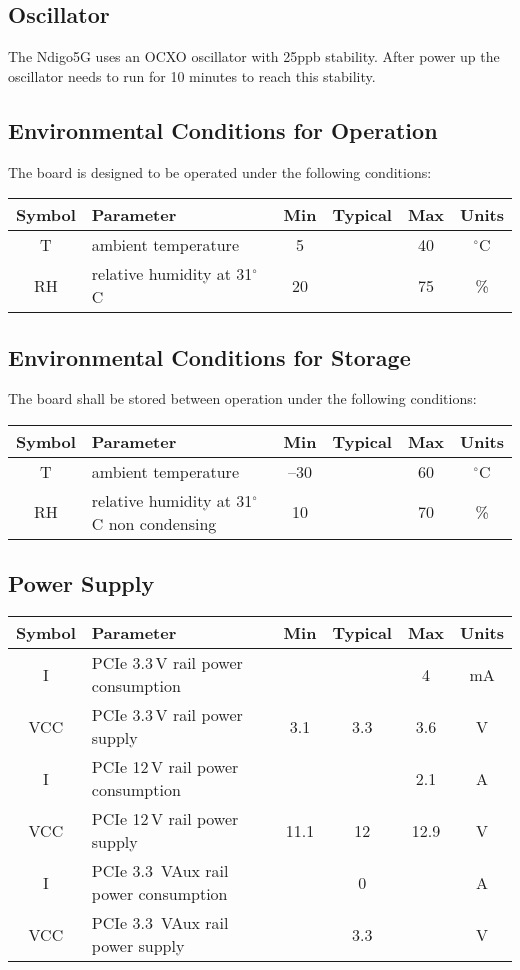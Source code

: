 	\subsection{Oscillator}
		
		The Ndigo5G uses an OCXO oscillator with 25ppb stability. After power up the oscillator needs to run for 10 minutes to reach this stability.
		
	\subsection{Environmental Conditions for Operation}
		\label{enviro_op}
		The board is designed to be operated under the following conditions:
		
		\noindent
		\begin{tabularx}{\textwidth}{|c|X|c|c|c|c|}
			\hline
			Symbol & Parameter & Min & Typical & Max & Units\\
			\hline\hline
			T & ambient temperature & 5 && 40 & $^{\circ}$C\\
			\hline
			RH & relative humidity at 31$^{\circ}$C & 20 && 75 & \%\\
			\hline
		\end{tabularx}
		
	\subsection{Environmental Conditions for Storage}
		\label{enviro_store}
		The board shall be stored between operation under the following conditions:
		
		\noindent
		\begin{tabularx}{\textwidth}{|c|X|c|c|c|c|}
			\hline
			Symbol & Parameter & Min & Typical & Max & Units\\
			\hline\hline
			T & ambient temperature & --30 && 60 & $^{\circ}$C\\
			\hline
			RH & relative humidity at 31$^{\circ}$C non condensing & 10 && 70 & \%\\
			\hline
		\end{tabularx}
		
	\subsection{Power Supply}
		
		\noindent
		\begin{tabularx}{\textwidth}{|c|X|c|c|c|c|}
			\hline
			Symbol & Parameter & Min & Typical & Max & Units\\
			\hline\hline
			I & PCIe 3.3\,V rail power consumption &&&4& mA\\
			\hline
			VCC & PCIe 3.3\,V rail power supply &3.1&3.3&3.6& V\\
			\hline
			I & PCIe 12\,V rail power consumption &&&2.1& A\\
			\hline
			VCC & PCIe 12\,V rail power supply &11.1&12&12.9& V\\
			\hline
			I & PCIe 3.3~VAux rail power consumption &&0&& A\\
			\hline
			VCC & PCIe 3.3~VAux rail power supply &&3.3&& V\\
			\hline
		\end{tabularx}
		
